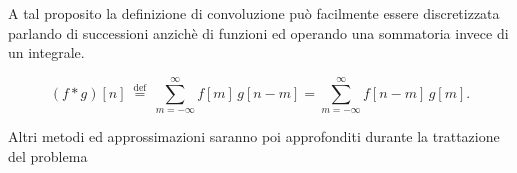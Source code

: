 A tal proposito la definizione di convoluzione può facilmente essere discretizzata parlando di successioni anzichè di funzioni ed operando una sommatoria invece di un integrale.

$$
(f*g)[n]\ {\stackrel {{\mathrm {def}}}{=}}\ \sum _{{m=-\infty }}^{\infty }f[m]\,g[n-m]=\sum _{{m=-\infty }}^{\infty }f[n-m]\,g[m].
$$

Altri metodi ed approssimazioni saranno poi approfonditi durante la trattazione del problema


